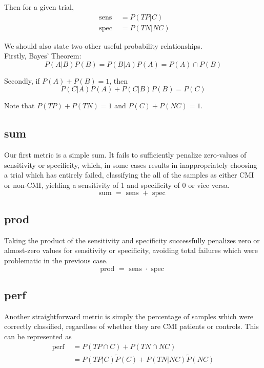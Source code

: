 \documentclass[10pt]{article}
\newcommand{\sens}{\mbox{ sens }}
\newcommand{\spec}{\mbox{ spec }}
\begin{document}
Then for a given trial,
\begin{align}
	\sens &= P(TP|C) \\
	\spec &= P(TN|NC)
\end{align}

We should also state two other useful probability relationships. \\

Firstly, Bayes' Theorem:
\begin{equation}
	P(A|B)P(B) = P(B|A)P(A) = P(A) \cap P(B)
\end{equation}

Secondly, if $P(A) + P(B) = 1$, then
\begin{equation}
	P(C|A)P(A) + P(C|B)P(B) = P(C)
\end{equation}

Note that $P(TP) + P(TN) = 1$ and $P(C) + P(NC) = 1$. \\

\subsection{sum}
Our first metric is a simple sum. It fails to sufficiently penalize zero-values of sensitivity or specificity, which, in some cases results in inappropriately choosing a trial which has entirely failed, classifying the all of the samples as either CMI or non-CMI, yielding a sensitivity of 1 and specificity of 0 or vice versa.
\begin{equation}
	\mbox{sum } = \sens + \spec
\end{equation}

\subsection{prod}
Taking the product of the sensitivity and specificity successfully penalizes zero or almost-zero values for sensitivity or specificity, avoiding total failures which were problematic in the previous case.
\begin{equation}
	\mbox{prod } = \sens\cdot\spec
\end{equation}

\subsection{perf}
Another straightforward metric is simply the percentage of samples which were correctly classified, regardless of whether they are CMI patients or controls.
This can be represented as 
\begin{align*}
	\mbox{perf } &= P(TP \cap C) + P(TN \cap NC) \\
	&= P(TP|C)\tilde{P}(C) + P(TN|NC)\tilde{P}(NC)
\end{align*}
\end{document}
